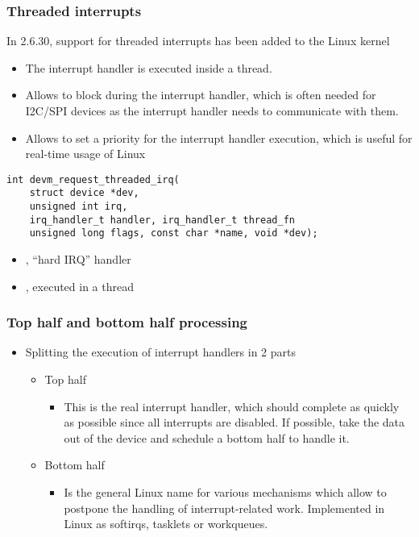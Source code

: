 \begin{frame}[fragile]
  \frametitle{Threaded interrupts}
  In 2.6.30, support for threaded interrupts has been added to
  the Linux kernel
  \begin{itemize}
  \item The interrupt handler is executed inside a thread.
  \item Allows to block during the interrupt handler, which is often
        needed for I2C/SPI devices as the interrupt handler needs to
        communicate with them.
  \item Allows to set a priority for the interrupt handler
        execution, which is useful for real-time usage of Linux
  \end{itemize}
  \begin{verbatim}
int devm_request_threaded_irq(
    struct device *dev,
    unsigned int irq,
    irq_handler_t handler, irq_handler_t thread_fn
    unsigned long flags, const char *name, void *dev);
  \end{verbatim}
  \begin{itemize}
  \item {}, ``hard IRQ'' handler
  \item {}, executed in a thread
  \end{itemize}
\end{frame}

\begin{frame}
  \frametitle{Top half and bottom half processing}
  \begin{itemize}
  \item Splitting the execution of interrupt handlers in 2 parts
    \begin{itemize}
    \item Top half
      \begin{itemize}
      \item This is the real interrupt handler, which should complete
        as quickly as possible since all interrupts are disabled. If
        possible, take the data out of the device and schedule a
        bottom half to handle it.
      \end{itemize}
    \item Bottom half
      \begin{itemize}
      \item Is the general Linux name for various mechanisms which
        allow to postpone the handling of interrupt-related
        work. Implemented in Linux as softirqs, tasklets or
        workqueues.
      \end{itemize}
    \end{itemize}
  \end{itemize}
\end{frame}

